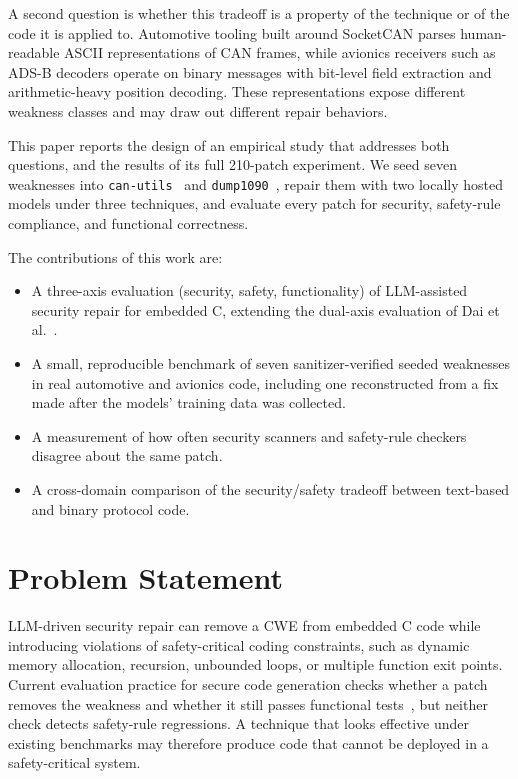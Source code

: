 \documentclass[12pt]{IEEEtran}
\begin{document}
A second question is whether this tradeoff is a property of the technique or of the code it is applied to. Automotive tooling built around SocketCAN parses human-readable ASCII representations of CAN frames, while avionics receivers such as ADS-B decoders operate on binary messages with bit-level field extraction and arithmetic-heavy position decoding. These representations expose different weakness classes and may draw out different repair behaviors.

This paper reports the design of an empirical study that addresses both questions, and the results of its full 210-patch experiment. We seed seven weaknesses into \texttt{can-utils}~\cite{canutils} and \texttt{dump1090}~\cite{dump1090}, repair them with two locally hosted models under three techniques, and evaluate every patch for security, safety-rule compliance, and functional correctness.

The contributions of this work are:
\begin{itemize}
    \item A three-axis evaluation (security, safety, functionality) of LLM-assisted security repair for embedded C, extending the dual-axis evaluation of Dai et al.~\cite{rethinking2026}.
    \item A small, reproducible benchmark of seven sanitizer-verified seeded weaknesses in real automotive and avionics code, including one reconstructed from a fix made after the models' training data was collected.
    \item A measurement of how often security scanners and safety-rule checkers disagree about the same patch.
    \item A cross-domain comparison of the security/safety tradeoff between text-based and binary protocol code.
\end{itemize}

\section{Problem Statement}
LLM-driven security repair can remove a CWE from embedded C code while introducing violations of safety-critical coding constraints, such as dynamic memory allocation, recursion, unbounded loops, or multiple function exit points. Current evaluation practice for secure code generation checks whether a patch removes the weakness and whether it still passes functional tests~\cite{rethinking2026, peng2025cweval}, but neither check detects safety-rule regressions. A technique that looks effective under existing benchmarks may therefore produce code that cannot be deployed in a safety-critical system.
\end{document}
